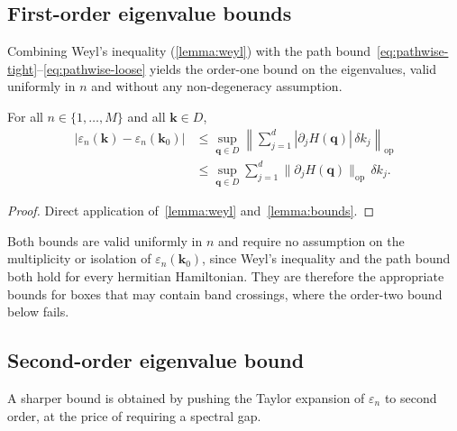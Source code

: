 \documentclass[11pt]{article}
\numberwithin{equation}{section}
\begin{document}
\subsection{First-order eigenvalue bounds}\label{sec:bounds-eigenvalues-1}

Combining Weyl's inequality (\autoref{lemma:weyl}) with the path
bound~\eqref{eq:pathwise-tight}–\eqref{eq:pathwise-loose} yields the order-one
bound on the eigenvalues, valid uniformly in \(n\) and without any non-degeneracy
assumption.

\begin{corollary}\label{cor:1st-eigenvalue-bound}
    For all \(n \in \{1,\dots,M\}\) and all \(\mathbf{k} \in D\),
    \begin{align}
        |\varepsilon_n(\mathbf{k}) - \varepsilon_n(\mathbf{k}_0)|
         & \leq \sup_{\mathbf{q}\in D}
        \left\| \sum_{j=1}^d |\partial_j H(\mathbf{q})|\, \delta k_j
        \right\|_\mathrm{op}
        \label{eq:eig-bound-tight}      \\
         & \leq \sup_{\mathbf{q} \in D}
        \sum_{j=1}^d \|\partial_j H(\mathbf{q})\|_\mathrm{op}\, \delta k_j.
        \label{eq:eig-bound-loose}
    \end{align}
\end{corollary}

\begin{proof}
    Direct application of~\autoref{lemma:weyl} and~\autoref{lemma:bounds}.
\end{proof}

\begin{remark}
    Both bounds are valid uniformly in \(n\) and require no assumption on the
    multiplicity or isolation of \(\varepsilon_n(\mathbf{k}_0)\), since Weyl's
    inequality and the path bound both hold for every hermitian Hamiltonian.
    They are therefore the appropriate bounds for boxes that may contain band
    crossings, where the order-two bound below fails.
\end{remark}

\subsection{Second-order eigenvalue bound}\label{sec:bounds-eigenvalues-2}

A sharper bound is obtained by pushing the Taylor expansion of \(\varepsilon_n\)
to second order, at the price of requiring a spectral gap.
\end{document}
